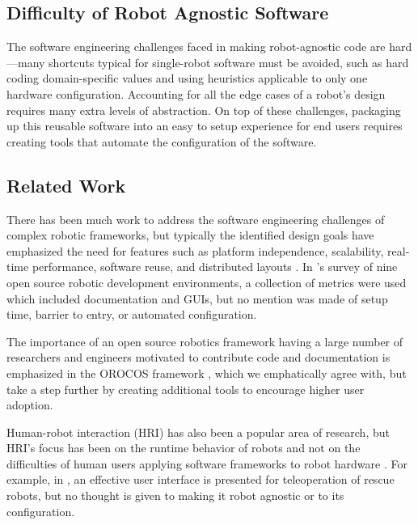 \documentclass[10pt,journal,compsoc]{joser1}
\begin{document}
{\subsection{Difficulty of Robot Agnostic Software}

The software engineering challenges faced in making robot-agnostic code are hard---many shortcuts typical for single-robot software must be avoided, such as hard coding domain-specific values and using heuristics applicable to only one hardware configuration. Accounting for all the edge cases of a robot's design requires many extra levels of abstraction. On top of these challenges, packaging up this reusable software into an easy to setup experience for end users requires creating tools that automate the configuration of the software.

\subsection{Related Work}

There has been much work to address the software engineering challenges of complex robotic frameworks, but typically the identified design goals have emphasized the need for features such as platform independence, scalability, real-time performance, software reuse, and distributed layouts \cite{realtime_framework, collett2005player, kramer2007development}. In \cite{kramer2007development}'s survey of nine open source robotic development environments, a collection of metrics were used which included documentation and GUIs, but no mention was made of setup time, barrier to entry, or automated configuration.

The importance of an open source robotics framework having a large number of researchers and engineers motivated to contribute code and documentation is emphasized in the OROCOS framework \cite{bruyninckx2001open}, which we emphatically agree with, but take a step further by creating additional tools to encourage higher user adoption.
  
Human-robot interaction (HRI) has also been a popular area of research, but HRI's focus has been on the runtime behavior of robots and not on the difficulties of human users applying software frameworks to robot hardware \cite{hci_metrics, yancotaxonomy, goodrichseven}. For example, in \cite{rescueRobots}, an effective user interface is presented for teleoperation of rescue robots, but no thought is given to making it robot agnostic or to its configuration. 

}
\end{document}
